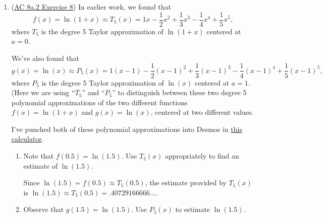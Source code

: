 \documentclass[10pt]{article}
\newenvironment{red}{\color{red}}{\ignorespacesafterend}
\begin{document}
\begin{enumerate}[leftmargin=0pt]
\begin{enumerate}
    \begin{red}
    This is actually a perfect description of what has happened: we took the thing we got for $\cos(x)$ and just replaced $x$ by $(x-\tfrac\pi2)$, and according to this trigonometric identity, that gives us the values of $\sin(x)$.
    \end{red}
    \end{enumerate}
    
\pagebreak

\item (\href{https://faculty.gvsu.edu/boelkinm/Home/ACS/sec-8a-2-taylor-poly.html#ez-8a-2-3}{AC 8a.2 Exercise 8}) In earlier work, we found that \begin{equation*}
f(x) = \ln(1+x) \approx T_5(x) = 1x - \frac{1}{2}x^2 + \frac{1}{3}x^3 - \frac{1}{4}x^4 + \frac{1}{5}x^5\text{,}
\end{equation*} where $T_5$ is the degree 5 Taylor approximation of $\ln(1+x)$ centered at $a=0$. 

We've also found that
\begin{equation*}
g(x) = \ln(x) \approx P_5(x) = 1(x-1) - \frac{1}{2}(x-1)^2 + \frac{1}{3}(x-1)^3 - \frac{1}{4}(x-1)^4 + \frac{1}{5}(x-1)^5\text{,}
\end{equation*} where $P_5$ is the degree 5 Taylor approximation of $\ln(x)$ centered at $a=1$. (Here we are using ``$T_5$'' and ``$P_5$'' to distinguish between these two degree 5 polynomial approximations of the two different functions $f(x) = \ln(1+x)$ and $g(x) = \ln(x)$, centered at two different values.

\begin{red}
I've punched both of these polynomial approximations into Desmos in \href{https://www.desmos.com/calculator/axd8gvso6n}{this calculator}.
\end{red}

\begin{enumerate}
    \item Note that $f(0.5) = \ln(1.5)$. Use $T_5(x)$ appropriately to find an estimate of $\ln(1.5)$.
    
    \begin{red}
    Since $\ln(1.5) = f(0.5) \approx T_5(0.5)$, the estimate provided by $T_5(x)$ is $\ln(1.5) \approx T_5(0.5) = .40729166666\ldots$.
    \end{red}
    
    \item Observe that $g(1.5) = \ln(1.5)$. Use $P_5(x)$ to estimate $\ln(1.5)$.
    

\end{enumerate}
\end{enumerate}
\end{document}
